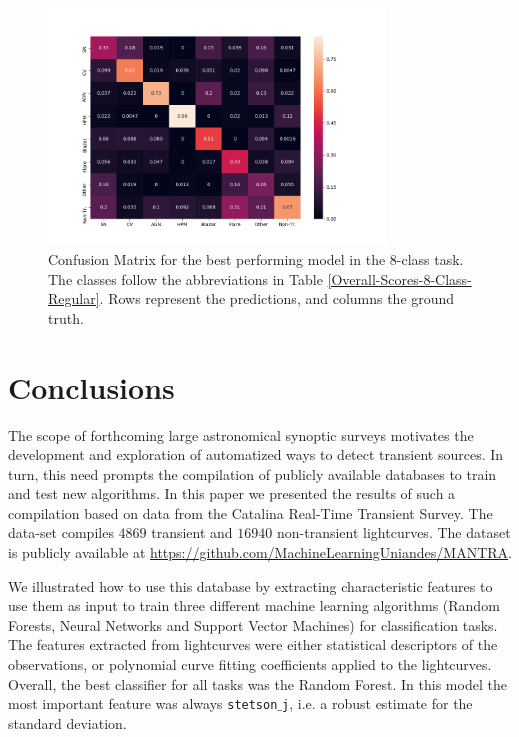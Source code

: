 \documentclass{aastex62}
\begin{document}
\begin{figure}
\begin{center}
	\includegraphics[width=0.8\textwidth]{normalizedCM.png}
\end{center}
  \caption{Confusion Matrix for the best performing model in the 8-class
  task. The classes follow the abbreviations in Table \ref{Overall-Scores-8-Class-Regular}. Rows represent the predictions, and columns the ground truth.}
  \label{fig:normalized8ClassCM}
\end{figure} 


\section{Conclusions}
\label{sec:conclusions}

The scope of forthcoming large astronomical synoptic surveys 
motivates the development and exploration of automatized ways to
detect transient sources. 
In turn, this need prompts the compilation of publicly available databases
to train and test new algorithms. 
In this paper we presented the results of such a compilation based on data
from the Catalina Real-Time Transient Survey.
The data-set compiles  $4869$ transient and $16940$ non-transient
lightcurves. 
The dataset is publicly available at
\url{https://github.com/MachineLearningUniandes/MANTRA}.   

We illustrated how to use this database by extracting 
characteristic features to use them as input to train three different
machine learning algorithms (Random Forests, Neural Networks and
Support Vector Machines) for classification tasks.
The features extracted from lightcurves were either statistical
descriptors of the observations, or polynomial curve fitting
coefficients applied to the lightcurves.   
Overall, the best classifier for all tasks was the Random Forest.
In this model the most important feature was always
\texttt{stetson$\_$j}, i.e. a robust estimate for the standard
deviation. 
\end{document}
